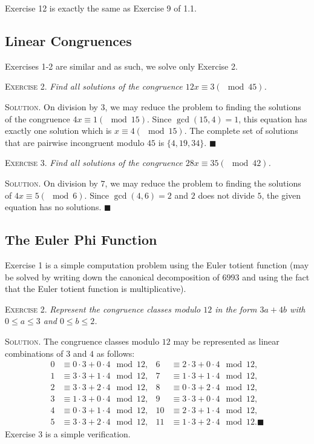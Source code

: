 \documentclass[11pt, leqno]{article}
\newcommand{\done}{\ensuremath{\blacksquare}}
\begin{document}
Exercise 12 is exactly the same as Exercise 9 of 1.1.

\subsection{Linear Congruences}

Exercises 1-2 are similar and as such, we solve only Exercise 2.

\textsc{Exercise 2}. \emph{Find all solutions of the congruence $12x \equiv 3 (\mod 45)$.}

\textsc{Solution}. On division by $3$, we may reduce the problem to finding the solutions of the congruence $4x \equiv 1 (\mod 15)$. Since $\gcd(15,4) =1$, this equation has exactly one solution which is $x\equiv 4(\mod 15)$. The complete set of solutions that are pairwise incongruent modulo $45$ is $\{ 4, 19, 34 \}$. \done

\textsc{Exercise 3}. \emph{Find all solutions of the congruence $28x \equiv 35 (\mod 42)$.}

\textsc{Solution}. On division by $7$, we may reduce the problem to finding the solutions of $4x \equiv 5 (\mod 6)$. Since $\gcd(4,6) = 2$ and $2$ does not divide $5$, the given equation has no solutions. \done

\subsection{The Euler Phi Function}

Exercise 1 is a simple computation problem using the Euler totient function (may be solved by writing down the canonical decomposition of $6993$ and using the fact that the Euler totient function is multiplicative).

\textsc{Exercise 2}. \emph{Represent the congruence classes modulo $12$ in the form $3a+4b$ with $0\leq a \leq 3$ and $0\leq b \leq 2$.}

\textsc{Solution}. The congruence classes modulo $12$ may be represented as linear combinations of $3$ and $4$ as follows: 
\begin{align*}
  0 & \equiv 0\cdot 3 + 0\cdot 4 \mod 12, & 6 & \equiv 2\cdot 3 + 0\cdot 4 \mod 12,\\
  1 & \equiv 3\cdot 3 + 1\cdot 4 \mod 12, & 7 & \equiv 1\cdot 3 + 1\cdot 4 \mod 12,\\
  2 & \equiv 3\cdot 3 + 2\cdot 4 \mod 12, & 8 & \equiv 0\cdot 3 + 2\cdot 4 \mod 12,\\
  3 & \equiv 1\cdot 3 + 0\cdot 4 \mod 12, & 9 & \equiv 3\cdot 3 + 0\cdot 4 \mod 12,\\
  4 & \equiv 0\cdot 3 + 1\cdot 4 \mod 12, & 10 & \equiv 2\cdot 3 + 1\cdot 4 \mod 12,\\
  5 & \equiv 3\cdot 3 + 2\cdot 4 \mod 12, & 11 & \equiv 1\cdot 3 + 2\cdot 4 \mod 12. \done
\end{align*}
Exercise 3 is a simple verification.
\end{document}
